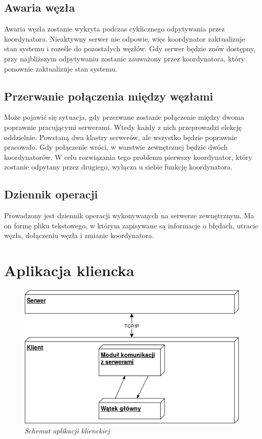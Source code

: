 \subsection{Awaria węzła}
Awaria węzła zostanie wykryta podczas cyklicznego odpytywania przez koordynatora. Nieaktywny serwer nie odpowie, więc koordynator zaktualizuje stan systemu i roześle do pozostałych węzłów. Gdy serwer będzie znów dostępny, przy najbliższym odpytywaniu zostanie zauważony przez koordynatora, który ponownie zaktualizuje stan systemu.

\subsection{Przerwanie połączenia między węzłami}
Może pojawić się sytuacja, gdy przerwane zostanie połączenie między dwoma poprawnie pracującymi serwerami. Wtedy każdy z nich przeprowadzi elekcję oddzielnie. Powstaną dwa klastry serwerów, ale wszystko będzie poprawnie pracowało. Gdy połączenie wróci, w warstwie zewnętrznej będzie dwóch koordynatorów. W celu rozwiązania tego problemu pierwszy koordynator, który zostanie odpytany przez drugiego, wyłącza u siebie funkcję koordynatora.

\subsection{Dziennik operacji}
Prowadzony jest dziennik operacji wykonywanych na serwerze zewnętrznym. Ma on formę pliku tekstowego, w którym zapisywane są informacje o błędach, utracie węzła, dołączeniu węzła i zmianie koordynatora.


\section{Aplikacja kliencka}

\begin{figure}[!h]
    \begin{center}
    \includegraphics[angle=0,scale=0.5]{img/client.png}
    \end{center}
    \caption{\em Schemat aplikacji klienckiej}
    \label{fig:client}
\end{figure}

